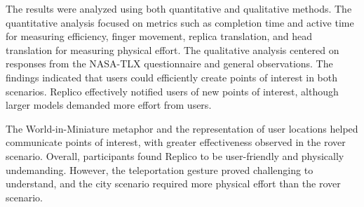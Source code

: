     The results were analyzed using both quantitative and qualitative methods. The quantitative analysis focused on metrics such as completion time and active time for measuring efficiency, finger movement, replica translation, and head translation for measuring physical effort. The qualitative analysis centered on responses from the NASA-TLX questionnaire and general observations. The findings indicated that users could efficiently create points of interest in both scenarios. Replico effectively notified users of new points of interest, although larger models demanded more effort from users. 

    The World-in-Miniature metaphor and the representation of user locations helped communicate points of interest, with greater effectiveness observed in the rover scenario. Overall, participants found Replico to be user-friendly and physically undemanding. However, the teleportation gesture proved challenging to understand, and the city scenario required more physical effort than the rover scenario.